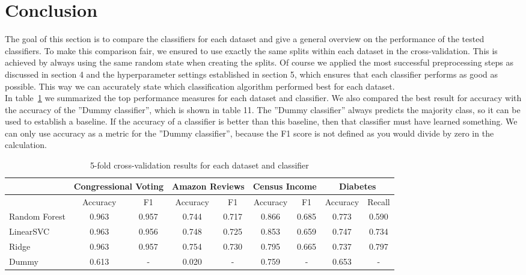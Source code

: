 \documentclass[a4paper,10pt]{article}
\begin{document}
\section{Conclusion}
The goal of this section is to compare the classifiers for each dataset and give a general overview on the
performance of the tested classifiers. To make this comparison fair, we ensured to use exactly the same
splits within each dataset in the cross-validation. This is achieved by always using the same random state
when creating the splits. Of course we applied the most successful preprocessing steps as discussed in
section 4 and the hyperparameter settings established in section 5, which ensures that each classifier
performs as good as possible. This way we can accurately state which classification algorithm performed
best for each dataset.\\
In table~\ref{tab:best_results} we summarized the top performance measures for each dataset and classifier. We also compared
the best result for accuracy with the accuracy of the ”Dummy classifier”, which is shown in table 11.
The ”Dummy classifier” always predicts the majority class, so it can be used to establish a baseline. If
the accuracy of a classifier is better than this baseline, then that classifier must have learned something.
We can only use accuracy as a metric for the ”Dummy classifier”, because the F1 score is not defined as
you would divide by zero in the calculation.
\begin{table}[h!]
\centering
\footnotesize
\begin{tabular}{|l|c|c|c|c|c|c|c|c|}
\hline
& \multicolumn{2}{c|}{Congressional Voting} & \multicolumn{2}{c|}{Amazon Reviews} & \multicolumn{2}{c|}{Census Income} & \multicolumn{2}{c|}{Diabetes} \\
\hline
& Accuracy & F1 & Accuracy & F1 & Accuracy & F1 & Accuracy & Recall \\
\hline
Random Forest & 0.963 & 0.957 & 0.744 & 0.717 & 0.866 & 0.685 & 0.773 & 0.590 \\
\hline
LinearSVC & 0.963 & 0.956 & 0.748 & 0.725 & 0.853 & 0.659 & 0.747 & 0.734 \\
\hline
Ridge & 0.963 & 0.957 & 0.754 & 0.730 & 0.795 & 0.665 & 0.737 & 0.797 \\
\hline
Dummy & 0.613 & - & 0.020 & - & 0.759 & - & 0.653 & - \\
\hline
\end{tabular}
\vspace{0.3cm}
\caption{5-fold cross-validation results for each dataset and classifier}
\label{tab:best_results}
\end{table}
\end{document}
